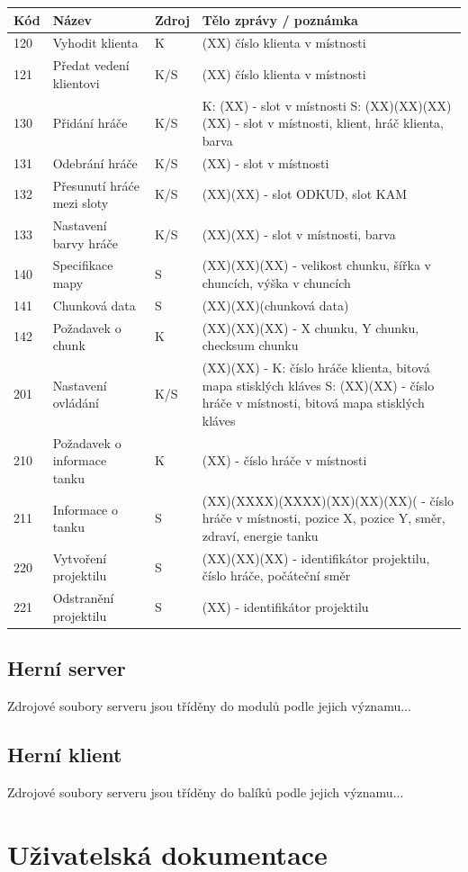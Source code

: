 \documentclass[12pt,a4paper]{article}
\let\oldsection\section
\renewcommand\section{\clearpage\oldsection}
\begin{document}
\begin{table}[h]
\center
\begin{tabular}{|l|p{3cm}|l|p{10cm}|}
\hline
\textbf{Kód} & \textbf{Název} & \textbf{Zdroj} & \textbf{Tělo zprávy / poznámka}\\ \hline
120 & Vyhodit klienta & K & (XX) číslo klienta v místnosti \\ \hline
121 & Předat vedení klientovi & K/S & (XX) číslo klienta v místnosti \\ \hline
130 & Přidání hráče & K/S & K: (XX) - slot v místnosti \newline S: (XX)(XX)(XX)(XX) - slot v místnosti, klient, hráč klienta, barva \\ \hline
131 & Odebrání hráče & K/S & (XX) - slot v místnosti \\ \hline
132 & Přesunutí hráće mezi sloty & K/S& (XX)(XX) - slot ODKUD, slot KAM \\ \hline
133 & Nastavení barvy hráče & K/S & (XX)(XX) - slot v místnosti, barva \\ \hline
140 & Specifikace mapy & S & (XX)(XX)(XX) - velikost chunku, šířka v chuncích, výška v chuncích \\ \hline
141 & Chunková data & S & (XX)(XX)(chunková data)\\ \hline
142 & Požadavek o chunk & K & (XX)(XX)(XX) - X chunku, Y chunku, checksum chunku \\ \hline
201 & Nastavení ovládání & K/S & (XX)(XX) - K: číslo hráče klienta, bitová mapa stisklých kláves \newline S: (XX)(XX) - číslo hráče v místnosti, bitová mapa stisklých kláves \\ \hline
210 & Požadavek o informace tanku & K & (XX) - číslo hráče v místnosti \\ \hline
211 & Informace o tanku & S & (XX)(XXXX)(XXXX)(XX)(XX)(XX)( - číslo hráče v místnosti, pozice X, pozice Y, směr, zdraví, energie tanku \\ \hline
220 & Vytvoření projektilu & S & (XX)(XX)(XX) - identifikátor projektilu, číslo hráče, počáteční směr \\ \hline
221 & Odstranění projektilu & S & (XX) - identifikátor projektilu \\ \hline


\end{tabular}
\end{table}


\subsection{Herní server}
Zdrojové soubory serveru jsou tříděny do modulů podle jejich významu...
\subsection{Herní klient}
Zdrojové soubory serveru jsou tříděny do balíků podle jejich významu...
\section{Uživatelská dokumentace}




\end{document}
